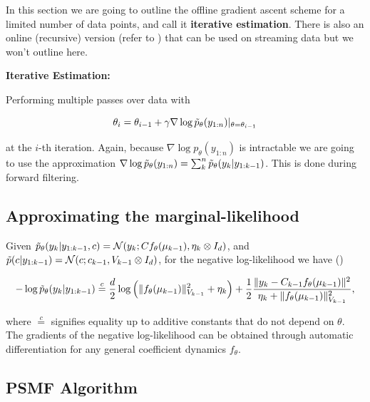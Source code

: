 \documentclass{mldsmsc}
\begin{document}
\noindent In this section we are going to outline the offline gradient ascent scheme for a limited number of data points, and call it \textbf{iterative estimation}. There is also an online (recursive) version (refer to \cite{akyildiz2021probabilistic}) that can be used on streaming data but we won't outline here. \newline

\noindent \textbf{Iterative Estimation:} \newline

\noindent Performing multiple passes over data with 

\begin{equation}
    \theta_i = \theta_{i-1} + \gamma \nabla \log \Tilde{p}_{\theta}(y_{1:n}) \vert_{\theta = \theta_{i-1}}
\end{equation}

\noindent at the $i$-th iteration. Again, because $\nabla \log p_{\theta}(y_{1:n})$ is intractable we are going to use the approximation $\nabla \log \Tilde{p}_{\theta}(y_{1:n}) = \sum_k^n \Tilde{p}_{\theta}(y_k | y_{1:k-1})$. This is done during forward filtering.

\subsection{Approximating the marginal-likelihood}

Given $\Tilde{p}_{\theta}(y_k | y_{1:k-1}, c) = \mathcal{N}(y_k; C f_{\theta}(\mu_{k-1}), \eta_k \otimes I_d)$, and $\Tilde{p}(c | y_{1:k-1}) = \mathcal{N}(c; c_{k-1}, V_{k-1} \otimes I_d)$, for the negative log-likelihood we have (\cite{akyildiz2021probabilistic})

\begin{equation}
    -\log \Tilde{p}_{\theta}(y_k | y_{1:k-1}) \overset{c}{=} \frac{d}{2} \log \left(\Vert f_{\theta}(\mu_{k-1}) \Vert_{V_{k-1}}^2 + \eta_k\right) + \frac{1}{2} \frac{\Vert y_k - C_{k-1} f_{\theta}(\mu_{k-1}) \Vert^2}{\eta_k + \Vert f_{\theta}(\mu_{k-1}) \Vert^2_{V_{k-1}}},
\end{equation}

\noindent where $\overset{c}{=}$ signifies equality up to additive constants that do not depend on $\theta$. The gradients of the negative log-likelihood can be obtained through automatic differentiation for any general coefficient dynamics $f_{\theta}$.

\subsection{PSMF Algorithm}
\end{document}
